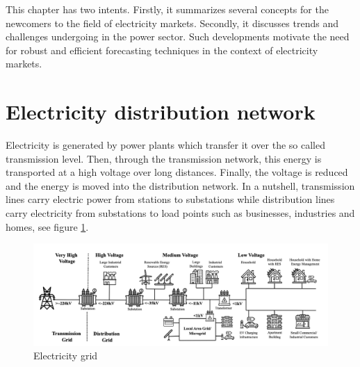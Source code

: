 
This chapter has two intents. Firstly, it summarizes several concepts for the newcomers to the field of electricity markets. Secondly, it discusses trends and challenges undergoing in the power sector. Such developments motivate the need for robust and efficient forecasting techniques in the context of electricity markets.


\section{Electricity distribution network}
Electricity is generated by power plants which transfer it over the so called transmission level. Then, through the transmission network, this energy is transported at a high voltage over long distances. Finally, the voltage is reduced and the energy is moved into the distribution network. In a nutshell, transmission lines carry electric power from stations to substations while distribution lines carry electricity from substations to load points such as businesses, industries and homes, see figure \ref{electricity_network}.

\begin{figure}[!h]
    \includegraphics[width=\textwidth]{images/electricity_network.png}
    \caption{Electricity grid \cite{haben2021review}}
    \label{electricity_network}
\end{figure}


